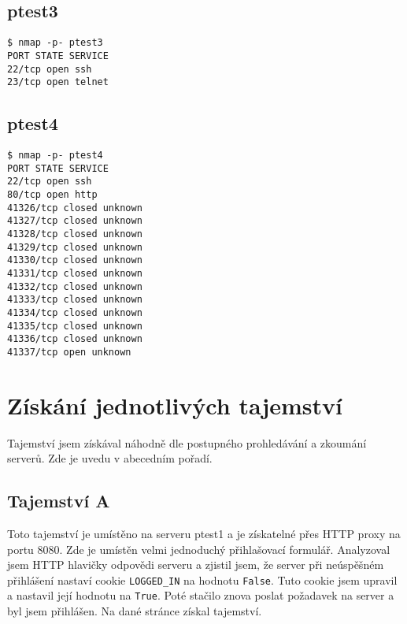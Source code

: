 \documentclass[11pt,a4paper]{article}
\begin{document}
\subsection{ptest3}
\texttt{\$ nmap -p- ptest3\\
PORT   STATE SERVICE\\
22/tcp open  ssh\\
23/tcp open  telnet\\
}

\subsection{ptest4}
\texttt{\$ nmap -p- ptest4\\
PORT      STATE  SERVICE\\
22/tcp    open   ssh\\
80/tcp    open   http\\
41326/tcp closed unknown\\
41327/tcp closed unknown\\
41328/tcp closed unknown\\
41329/tcp closed unknown\\
41330/tcp closed unknown\\
41331/tcp closed unknown\\
41332/tcp closed unknown\\
41333/tcp closed unknown\\
41334/tcp closed unknown\\
41335/tcp closed unknown\\
41336/tcp closed unknown\\
41337/tcp open   unknown\\
}

\section{Získání jednotlivých tajemství}

Tajemství jsem získával náhodně dle postupného prohledávání a zkoumání serverů. Zde je uvedu v abecedním pořadí.

\subsection{Tajemství A}
Toto tajemství je umístěno na serveru ptest1 a je získatelné přes HTTP proxy na portu 8080. Zde je umístěn velmi jednoduchý přihlašovací formulář. Analyzoval jsem HTTP hlavičky odpovědi serveru a zjistil jsem, že server při neúspěšném přihlášení nastaví cookie \texttt{LOGGED_IN} na hodnotu \texttt{False}. Tuto cookie jsem upravil a nastavil její hodnotu na \texttt{True}. Poté stačilo znova poslat požadavek na server a byl jsem přihlášen. Na dané stránce získal tajemství.
\end{document}
